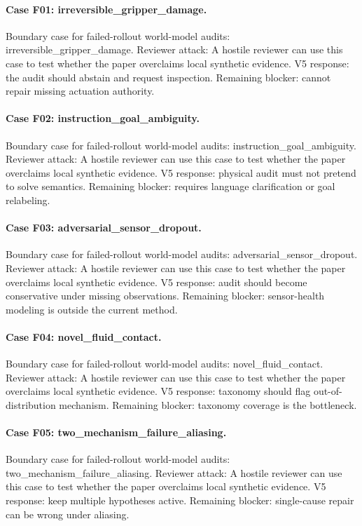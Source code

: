 \documentclass{article}
\begin{document}
\paragraph{Case F01: irreversible\_gripper\_damage.} Boundary case for failed-rollout world-model audits: irreversible\_gripper\_damage. Reviewer attack: A hostile reviewer can use this case to test whether the paper overclaims local synthetic evidence. V5 response: the audit should abstain and request inspection. Remaining blocker: cannot repair missing actuation authority.
\paragraph{Case F02: instruction\_goal\_ambiguity.} Boundary case for failed-rollout world-model audits: instruction\_goal\_ambiguity. Reviewer attack: A hostile reviewer can use this case to test whether the paper overclaims local synthetic evidence. V5 response: physical audit must not pretend to solve semantics. Remaining blocker: requires language clarification or goal relabeling.
\paragraph{Case F03: adversarial\_sensor\_dropout.} Boundary case for failed-rollout world-model audits: adversarial\_sensor\_dropout. Reviewer attack: A hostile reviewer can use this case to test whether the paper overclaims local synthetic evidence. V5 response: audit should become conservative under missing observations. Remaining blocker: sensor-health modeling is outside the current method.
\paragraph{Case F04: novel\_fluid\_contact.} Boundary case for failed-rollout world-model audits: novel\_fluid\_contact. Reviewer attack: A hostile reviewer can use this case to test whether the paper overclaims local synthetic evidence. V5 response: taxonomy should flag out-of-distribution mechanism. Remaining blocker: taxonomy coverage is the bottleneck.
\paragraph{Case F05: two\_mechanism\_failure\_aliasing.} Boundary case for failed-rollout world-model audits: two\_mechanism\_failure\_aliasing. Reviewer attack: A hostile reviewer can use this case to test whether the paper overclaims local synthetic evidence. V5 response: keep multiple hypotheses active. Remaining blocker: single-cause repair can be wrong under aliasing.
\end{document}
